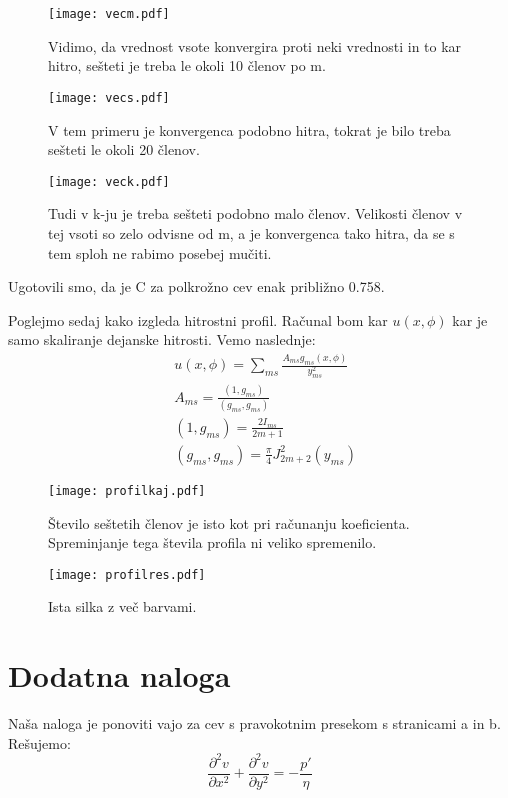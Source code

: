 \documentclass{article}
\begin{document}
\begin{figure}[H]
\texttt{[image: vecm.pdf]}
\caption*{Vidimo, da vrednost vsote konvergira proti neki vrednosti in to kar hitro, sešteti je treba le okoli 10 členov po m.}
\end{figure}

\begin{figure}[H]
\texttt{[image: vecs.pdf]}
\caption*{V tem primeru je konvergenca podobno hitra, tokrat je bilo treba sešteti le okoli 20 členov.}
\end{figure}

\begin{figure}[H]
\texttt{[image: veck.pdf]}
\caption*{Tudi v k-ju je treba sešteti podobno malo členov. Velikosti členov v tej vsoti so zelo odvisne od m, a je konvergenca tako hitra, da se s tem sploh ne rabimo posebej mučiti.}
\end{figure}

Ugotovili smo, da je C za polkrožno cev enak približno 0.758.

Poglejmo sedaj kako izgleda hitrostni profil.
Računal bom kar $u(x,\phi)$ kar je samo skaliranje dejanske hitrosti.
Vemo naslednje:
\begin{align*}
&u(x,\phi) = \sum_{ms} \frac{A_{ms} g_{ms}(x,\phi)}{y_{ms}^2} \\
&A_{ms} = \frac{(1,g_{ms})}{(g_{ms},g_{ms})} \\
& (1,g_{ms}) = \frac{2 I_{ms}}{2m+1} \\
& (g_{ms},g_{ms}) = \frac{\pi}{4} J_{2m+2}^2(y_{ms}) 
\end{align*}

\begin{figure}[H]
\texttt{[image: profilkaj.pdf]}
\caption*{Število seštetih členov je isto kot pri računanju koeficienta. Spreminjanje tega števila profila ni veliko spremenilo.}
\end{figure}
\begin{figure}[H]
\texttt{[image: profilres.pdf]}
\caption*{Ista silka z več barvami.}
\end{figure}

\newpage
\section{Dodatna naloga}

Naša naloga je ponoviti vajo za cev s pravokotnim presekom s stranicami a in b.
Rešujemo:
\begin{equation*}
\frac{\partial ^2 v}{\partial x^2} + \frac{\partial ^2 v}{\partial y^2} = - \frac{p'}{\eta}
\end{equation*}
\end{document}
